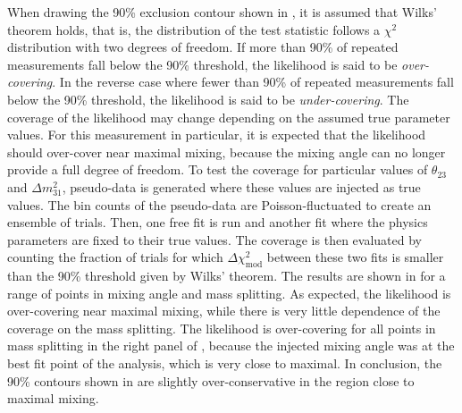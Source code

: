 When drawing the 90\% exclusion contour shown in , it is assumed that Wilks' theorem holds, that is, the distribution of the test statistic follows a $\chi^2$ distribution with two degrees of freedom. If more than 90\% of repeated measurements fall below the 90\% threshold, the likelihood is said to be \emph{over-covering}. In the reverse case where fewer than 90\% of repeated measurements fall below the 90\% threshold, the likelihood is said to be \emph{under-covering}. The coverage of the likelihood may change depending on the assumed true parameter values. For this measurement in particular, it is expected that the likelihood should over-cover near maximal mixing, because the mixing angle can no longer provide a full degree of freedom. To test the coverage for particular values of $\theta_{23}$ and $\Delta m^2_{31}$, pseudo-data is generated where these values are injected as true values. The bin counts of the pseudo-data are Poisson-fluctuated to create an ensemble of trials. Then, one free fit is run and another fit where the physics parameters are fixed to their true values. The coverage is then evaluated by counting the fraction of trials for which $\Delta \chi^2_{\mathrm{mod}}$ between these two fits is smaller than the 90\% threshold given by Wilks' theorem. The results are shown in  for a range of points in mixing angle and mass splitting. As expected, the likelihood is over-covering near maximal mixing, while there is very little dependence of the coverage on the mass splitting. The likelihood is over-covering for all points in mass splitting in the right panel of , because the injected mixing angle was at the best fit point of the analysis, which is very close to maximal. In conclusion, the 90\% contours shown in  are slightly over-conservative in the region close to maximal mixing.

